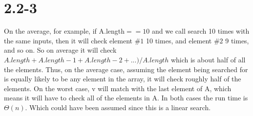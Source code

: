 \documentclass[12pt]{article}
\begin{document}
\section{2.2-3}
On the average, for example, if A.length$==10$ and we call search 10 times with the same inputs, then it will check element $\#1$ 10 times, and element $\#2$ 9 times, and so on. So on average it will check $A.length+A.length-1+A.length-2+...)/A.length$ which is about half of all the elements. Thus, on the average case, assuming the element being searched for is equally likely to be any element in the array, it will check roughly half of the elements. \newline
On the worst case, v will match with the last element of A, which means it will have to check all of the elements in A. \newline
In both cases the run time is $\Theta(n)$. Which could have been assumed since this is a linear search.
    
\end{document}
